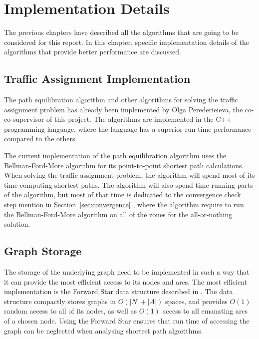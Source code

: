 \chapter{Implementation Details} \label{chap:implementation}

The previous chapters have described all the algorithms that are going to be considered for this report. 
In this chapter, specific implementation details of the algorithms that provide better performance are discussed.

\section{Traffic Assignment Implementation}
The path equilibration algorithm and other algorithms for solving the traffic assignment problem has already been implemented by Olga Perederieieva, the co-co-supervisor of this project.
The algorithms are implemented in the C++ programming language,
where the language has a superior run time performance compared to the others.

The current implementation of the path equilibration algorithm uses the Bellman-Ford-More algorithm for its point-to-point shortest path calculations.
When solving the traffic assignment problem,
the algorithm will spend most of its time computing shortest paths.
The algorithm will also spend time running parts of the algorithm,
but most of that time is dedicated to the convergence check step mention in Section~\ref{sec:convergence} ,
where the algorithm require to run the Bellman-Ford-More algorithm on all of the zones for the all-or-nothing solution.

\section{Graph Storage}
The storage of the underlying graph need to be implemented in such a way that it can provide the most efficient access to its nodes and arcs.
The most efficient implementation is the Forward Star data structure described in \citet{Sheffi}.
The data structure compactly stores graphs in $O(|N|+|A|)$ spaces,
and provides $O(1)$ random access to all of its nodes,
as well as $O(1)$ access to all emanating arcs of a chosen node.
Using the Forward Star ensures that run time of accessing the graph can be neglected when analysing shortest path algorithms.

